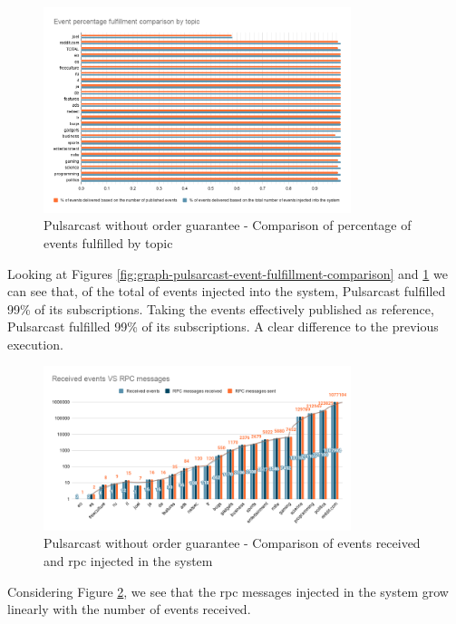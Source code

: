 \begin{figure}[!htb]
  \centering
  \includegraphics[width=0.8\textwidth]{../images/graph-pulsarcast-event-percentage-fulfillment-comparison.png}
  \caption{Pulsarcast without order guarantee - Comparison of percentage of events fulfilled by topic}
  \label{fig:graph-pulsarcast-event-percentage-fulfillment-comparison}
\end{figure}

Looking at Figures \ref{fig:graph-pulsarcast-event-fulfillment-comparison} and
\ref{fig:graph-pulsarcast-event-percentage-fulfillment-comparison} we can see
that, of the total of events injected into the system, Pulsarcast fulfilled
99\% of its subscriptions. Taking the events effectively published as
reference, Pulsarcast fulfilled 99\% of its subscriptions. A clear difference
to the previous execution.

\begin{figure}[!htb]
  \centering
  \includegraphics[width=0.8\textwidth]{../images/graph-pulsarcast-rpc.png}
  \caption{Pulsarcast without order guarantee - Comparison of events received and \acrshort{rpc} injected in the system}
  \label{fig:graph-pulsarcast-rpc}
\end{figure}

Considering Figure \ref{fig:graph-pulsarcast-rpc}, we see that the \acrshort{rpc} messages
injected in the system grow linearly with the number of events received.

